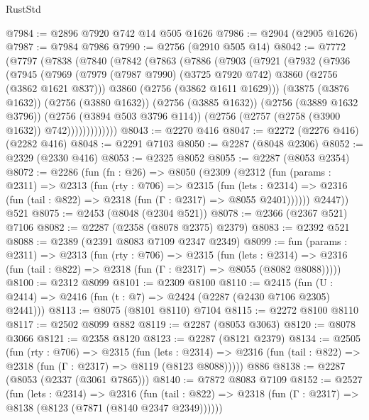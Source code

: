 \begin{lexlean}{RustStd}
\begin{coremodule}
@7984 := @2896 @7920 @742 @14 @505 @1626
@7986 := @2904 (@2905 @1626)
@7987 := @7984 @7986
@7990 := @2756 (@2910 @505 @14)
@8042 := @7772
    (@7797
      (@7838
        (@7840
          (@7842
            (@7863
              (@7886
                (@7903
                  (@7921
                    (@7932
                      (@7936
                        (@7945
                          (@7969
                            (@7979
                              (@7987 @7990)
                              (@3725 @7920 @742)
                              @3860
                              (@2756 (@3862 @1621 @837)))
                            @3860
                            (@2756 (@3862 @1611 @1629)))
                          (@3875 (@3876 @1632))
                          (@2756 (@3880 @1632))
                          (@2756 (@3885 @1632))
                          (@2756 (@3889 @1632 @3796))
                          (@2756 (@3894 @503 @3796 @114))
                          (@2756 (@2757 (@2758 (@3900 @1632)) @742)))))))))))))
@8043 := @2270 @416
@8047 := @2272 (@2276 @416) (@2282 @416)
@8048 := @2291 @7103
@8050 := @2287 (@8048 @2306)
@8052 := @2329 (@2330 @416)
@8053 := @2325 @8052
@8055 := @2287 (@8053 @2354)
@8072 := @2286
    (fun (fn : @26) =>
    @8050
      (@2309
        (@2312
          (fun (params : @2311) =>
          @2313
            (fun (rty : @706) =>
            @2315
              (fun (lets : @2314) =>
              @2316 (fun (tail : @822) => @2318 (fun (Γ : @2317) => @8055 @2401))))))
        @2447))
    @521
@8075 := @2453 (@8048 (@2304 @521))
@8078 := @2366 (@2367 @521) @7106
@8082 := @2287 (@2358 (@8078 @2375) @2379)
@8083 := @2392 @521
@8088 := @2389 (@2391 @8083 @7109 @2347 @2349)
@8099 := fun (params : @2311) =>
  @2313
    (fun (rty : @706) =>
    @2315
      (fun (lets : @2314) =>
      @2316 (fun (tail : @822) => @2318 (fun (Γ : @2317) => @8055 (@8082 @8088)))))
@8100 := @2312 @8099
@8101 := @2309 @8100
@8110 := @2415 (fun (U : @2414) => @2416 (fun (t : @7) => @2424 (@2287 (@2430 @7106 @2305) @2441)))
@8113 := @8075 (@8101 @8110) @7104
@8115 := @2272 @8100 @8110
@8117 := @2502 @8099 @882
@8119 := @2287 (@8053 @3063)
@8120 := @8078 @3066
@8121 := @2358 @8120
@8123 := @2287 (@8121 @2379)
@8134 := @2505
    (fun (rty : @706) =>
    @2315
      (fun (lets : @2314) =>
      @2316 (fun (tail : @822) => @2318 (fun (Γ : @2317) => @8119 (@8123 @8088)))))
    @886
@8138 := @2287 (@8053 (@2337 (@3061 @7865)))
@8140 := @7872 @8083 @7109
@8152 := @2527
    (fun (lets : @2314) =>
    @2316
      (fun (tail : @822) => @2318 (fun (Γ : @2317) => @8138 (@8123 (@7871 (@8140 @2347 @2349))))))

\end{coremodule}
\end{lexlean}
